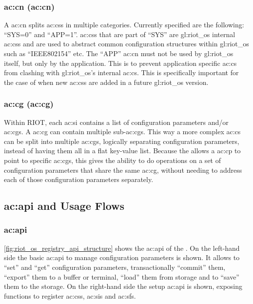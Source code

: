 \subsubsection{\acrlong*{ac:cn} (\acrshort*{ac:cn})}
\label{sec:design:riot_registry:configuration_path_namespace}

A \gls{ac:cn} splits \glspl{ac:cs} in multiple categories. Currently specified are the following: ``SYS=0'' and ``APP=1''.
\glspl{ac:cs} that are part of ``SYS'' are \gls{gl:riot_os} internal \glspl{ac:cs} and are used to abstract common configuration structures within \gls{gl:riot_os} such as ``IEEE802154'' etc.
The ``APP'' \gls{ac:cn} must not be used by \gls{gl:riot_os} itself, but only by the application.
This is to prevent application specific \gls{ac:cs} from clashing with \gls{gl:riot_os}'s internal \gls{ac:cs}.
This is specifically important for the case of when new \glspl{ac:cs} are added in a future \gls{gl:riot_os} version.

\subsubsection{\acrlong*{ac:cg} (\acrshort*{ac:cg})}
\label{sec:design:riot_registry:configuration_path_group}

Within RIOT, each \gls{ac:si} contains a list of configuration parameters and/or \glspl{ac:cg}.
A \gls{ac:cg} can contain multiple sub-\glspl{ac:cg}.
This way a more complex \gls{ac:cs} can be split into multiple \glspl{ac:cg}, logically separating configuration parameters, instead of having them all in a flat key-value list.
Because the  allows a \gls{ac:cp} to point to specific \glspl{ac:cg}, this gives the ability to do operations on a set of configuration parameters that share the same \gls{ac:cg}, without needing to address each of those configuration parameters separately.

\subsection{\acrshort*{ac:api} and Usage Flows}
\label{sec:design:riot_registry:usage_flow}

\subsubsection{\gls*{ac:api}}

\autoref{fig:riot_os_registry_api_structure} shows the \gls{ac:api} of the .
On the left-hand side the basic \gls{ac:api} to manage configuration parameters is shown.
It allows to ``set'' and ``get'' configuration parameters, transactionally ``commit'' them, ``export'' them to a buffer or terminal, ``load'' them from storage and to ``save'' them to the storage.
On the right-hand side the setup \gls{ac:api} is shown, exposing functions to register \glspl{ac:cs}, \glspl{ac:si} and \glspl{ac:sf}.

